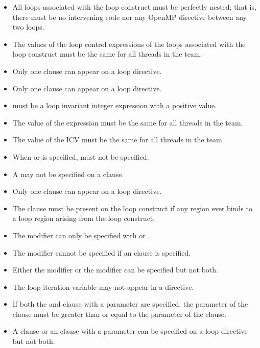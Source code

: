 \begin{itemize}
\item All loops associated with the loop construct must be perfectly nested; that is, there 
must be no intervening code nor any OpenMP directive between any two loops.

\item The values of the loop control expressions of the loops associated with the loop 
construct must be the same for all threads in the team.

\item Only one  clause can appear on a loop directive.

\item Only one  clause can appear on a loop directive.

\item {} must be a loop invariant integer expression with a positive value.

\item The value of the  expression must be the same for all threads in the team.

\item The value of the  ICV must be the same for all threads in the team.

\item When  or  is specified,  must 
not be specified.

\item A  may not be specified on a  clause.

\item Only one  clause can appear on a loop directive.

\item The  clause must be present on the loop construct if any  region 
ever binds to a loop region arising from the loop construct.

\item The  modifier can only be specified with  or .

\item The  modifier cannot be specified if an  clause is specified.

\item Either the  modifier or the  modifier can be specified but not both.

\item The loop iteration variable may not appear in a  directive.

\item If both the  and  clause with a parameter are specified,
the parameter of the  clause must be greater than or equal to the parameter of the
 clause.

\item A  clause or an  clause with a parameter can be specified on a loop directive but not both.
\end{itemize}


